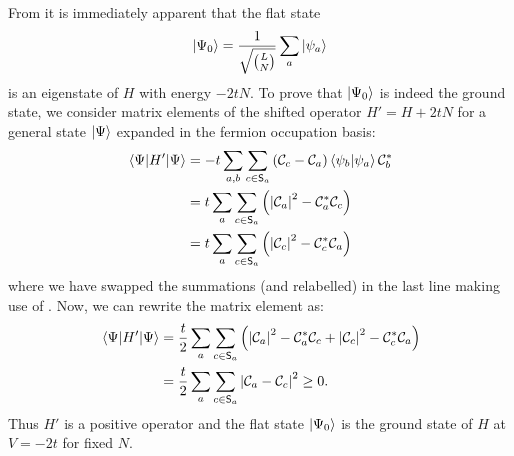 From  it is immediately apparent that the flat state
\begin{equation}
\ket{\Psi_0} = \frac{1}{\sqrt{{L}\choose{N}}} \sum_a \ket{\psi_a}
    \label{eq:Psiflat}
\end{equation}
is an eigenstate of $H$ with energy $-2 t N$. To prove that $\ket{\Psi_0}$ is
indeed the ground state, we consider matrix elements of the shifted operator $H' = H +
2 t N$ for a general state $\ket{\Psi}$ expanded in the fermion occupation
basis:
%
\begin{align}
    \expval{H'}{\Psi} &= -t \sum_{a,b} \sum_{c \in \mathsf{S}_a}
    \qty(\mathcal{C}_c - \mathcal{C}_a) \braket{\psi_b}{\psi_a}
    \mathcal{C}^\ast_b \nonumber \\
                      &= t \sum_a \sum_{c \in \mathsf{S}_a}\qty(
                      \qty|\mathcal{C}_a|^2 - \mathcal{C}_a^\ast \mathcal{C}_c)
                      \nonumber \\
                      &= t \sum_a \sum_{c \in \mathsf{S}_a}\qty(
                      \qty|\mathcal{C}_c|^2 - \mathcal{C}_c^\ast \mathcal{C}_a)
\label{eq:HpExpValue}
\end{align}
%
where we have swapped the summations (and relabelled) in the last line making
use of . Now, we can rewrite the matrix element as:
%
\begin{align}
    \expval{H'}{\Psi} &= \frac{t}{2} \sum_a \sum_{c \in \mathsf{S}_a} \qty(
                      \qty|\mathcal{C}_a|^2 - \mathcal{C}_a^\ast \mathcal{C}_c
+ \qty|\mathcal{C}_c|^2 - \mathcal{C}_c^\ast \mathcal{C}_a) \nonumber \\
                      &= \frac{t}{2} \sum_a \sum_{c \in \mathsf{S}_a}
                      \qty|\mathcal{C}_a - \mathcal{C}_c|^2 \ge 0. 
\label{eq:HpExpValue2}
\end{align}
%
Thus $H'$ is a positive operator and the flat state $\ket{\Psi_0}$ is the
ground state of $H$ at $V = -2t$ for fixed $N$.

\FloatBarrier